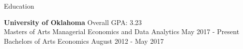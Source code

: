 \documentclass{resume} %
\begin{document}

\begin{rSection}{Education}

{\bf University of Oklahoma} \hfill {Overall GPA: 3.23} 
\\ Masters of Arts Managerial Economics and Data Analytics \hfill {May 2017 - Present}{}
\\ Bachelors of Arts Economics \hfill {August 2012 - May 2017} 


\end{rSection}




\end{document}
